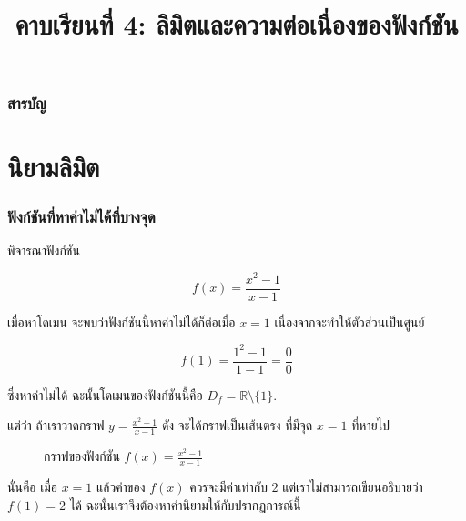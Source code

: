 \usetikzlibrary{arrows.meta}
\title{คาบเรียนที่ 4: ลิมิตและความต่อเนื่องของฟังก์ชัน}
\frame{\titlepage}

\begin{frame}
\frametitle{สารบัญ}
\tableofcontents
\end{frame}

\section{นิยามลิมิต}
\frame{\sectionpage}

\begin{frame}
\frametitle{ฟังก์ชันที่หาค่าไม่ได้ที่บางจุด}
พิจารณาฟังก์ชัน
\begin{remark}{}
\[ f(x) = \frac{x^2-1}{x-1}\]
\end{remark}

เมื่อหาโดเมน จะพบว่าฟังก์ชันนี้หาค่าไม่ได้ก็ต่อเมื่อ $x=1$ เนื่องจากจะทำให้ตัวส่วนเป็นศูนย์

\[f(1) = \frac{1^2-1}{1-1} = \frac{0}{0}\]

ซึ่งหาค่าไม่ได้ ฉะนั้นโดเมนของฟังก์ชันนี้คือ $D_f = \mathbb{R} \setminus \{1\}$.
\end{frame}


\begin{frame}
แต่ว่า ถ้าเราวาดกราฟ $y = \tfrac{x^2-1}{x-1}$ ดัง จะได้กราฟเป็นเส้นตรง ที่มีจุด $x=1$ ที่หายไป

\begin{figure}[h!]
\centering
{}
\caption{กราฟของฟังก์ชัน $f(x) = \tfrac{x^2-1}{x-1}$}
\label{fig:limit_intro}
\end{figure}

นั่นคือ เมื่อ $x=1$ แล้วค่าของ $f(x)$ ควรจะมีค่าเท่ากับ $2$ แต่เราไม่สามารถเขียนอธิบายว่า $f(1) = 2$ ได้ ฉะนั้นเราจึงต้องหาคำนิยามให้กับปรากฏการณ์นี้
\end{frame}

